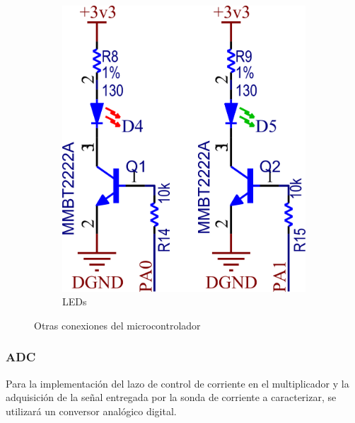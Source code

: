 \documentclass[titlepage, 12pt]{article}
\begin{document}
\begin{figure}[!htbp]
\begin{subfigure}[b]{0.49\textwidth}
            \includegraphics[scale=1.1]{images/arm-leds.png}
            \caption{LEDs}
            \label{fig:arm-leds}
        \end{subfigure}
        \caption{Otras conexiones del microcontrolador}
    \end{figure}

\subsubsection{ADC}
Para la implementación del lazo de control de corriente en el multiplicador y la adquisición de la señal entregada por la sonda de corriente a caracterizar, se utilizará un conversor analógico digital.
\end{document}
